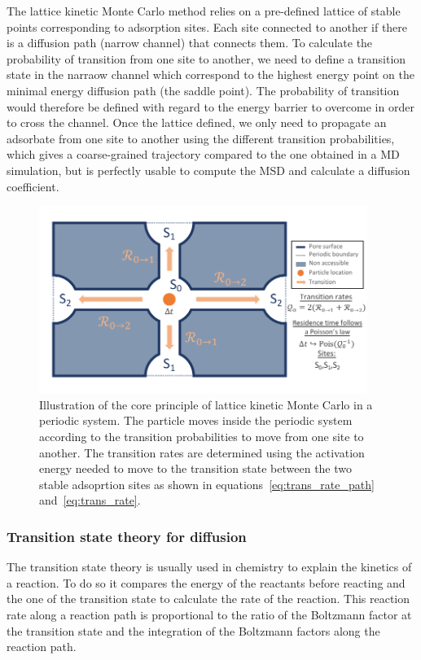 \documentclass[main]{subfiles}
\begin{document}
The lattice kinetic Monte Carlo method relies on a pre-defined lattice of stable points corresponding to adsorption sites. Each site connected to another if there is a diffusion path (narrow channel) that connects them. To calculate the probability of transition from one site to another, we need to define a transition state in the narraow channel which correspond to the highest energy point on the minimal energy diffusion path (the saddle point). The probability of transition would therefore be defined with regard to the energy barrier to overcome in order to cross the channel. Once the lattice defined, we only need to propagate an adsorbate from one site to another using the different transition probabilities, which gives a coarse-grained trajectory compared to the one obtained in a MD simulation, but is perfectly usable to compute the MSD and calculate a diffusion coefficient.


\begin{figure}[ht]
  \centering
    \includegraphics[width=0.95\textwidth]{figures/5-diffusion/kinetic_MC.pdf}
    \caption{Illustration of the core principle of lattice kinetic Monte Carlo in a periodic system. The particle moves inside the periodic system according to the transition probabilities to move from one site to another. The transition rates are determined using the activation energy needed to move to the transition state between the two stable adsoprtion sites as shown in equations~\ref{eq:trans_rate_path} and~\ref{eq:trans_rate}. }\label{fgr:kMC_principle}
\end{figure}

\subsubsection{Transition state theory for diffusion}

The transition state theory is usually used in chemistry to explain the kinetics of a reaction. To do so it compares the energy of the reactants before reacting and the one of the transition state to calculate the rate of the reaction. This reaction rate along a reaction path is proportional to the ratio of the Boltzmann factor at the transition state and the integration of the Boltzmann factors along the reaction path.
\end{document}
